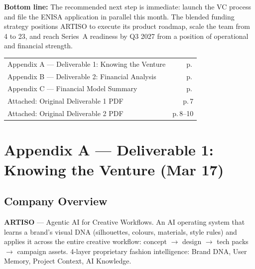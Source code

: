 \documentclass[11pt,a4paper]{article}
\begin{document}
\textbf{Bottom line:} The recommended next step is immediate: launch the VC process and file the ENISA application in parallel this month. The blended funding strategy positions ARTISO to execute its product roadmap, scale the team from 4 to 23, and reach Series~A readiness by Q3 2027 from a position of operational and financial strength.

\vfill
\begin{tcolorbox}[
    colback=gray!5,
    colframe=gray!50,
    boxrule=0.4pt,
    arc=2pt,
    left=6pt, right=6pt, top=4pt, bottom=4pt,
    title={\small\bfseries Appendix Contents},
    coltitle=black,
    fonttitle=\small\bfseries,
    colbacktitle=gray!15
]
\small
\begin{tabularx}{\textwidth}{@{}Xr@{}}
Appendix A --- Deliverable 1: Knowing the Venture & p.\,\pageref{app:A} \\
Appendix B --- Deliverable 2: Financial Analysis & p.\,\pageref{app:B} \\
Appendix C --- Financial Model Summary & p.\,\pageref{app:C} \\
Attached: Original Deliverable 1 PDF & p.\,7 \\
Attached: Original Deliverable 2 PDF & p.\,8--10 \\
\end{tabularx}
\end{tcolorbox}

\newpage
\section*{Appendix A --- Deliverable 1: Knowing the Venture (Mar 17)}
\label{app:A}

\subsection*{Company Overview}
\textbf{ARTISO} --- Agentic AI for Creative Workflows. An AI operating system that learns a brand's visual DNA (silhouettes, colours, materials, style rules) and applies it across the entire creative workflow: concept $\rightarrow$ design $\rightarrow$ tech packs $\rightarrow$ campaign assets. 4-layer proprietary fashion intelligence: Brand DNA, User Memory, Project Context, AI Knowledge.
\end{document}
